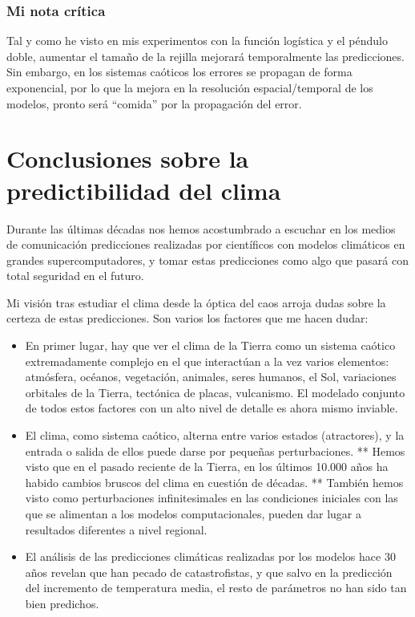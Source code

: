 \documentclass[
  10pt,
  a4paper,
  DIV=11,
  numbers=noendperiod,
  open=any]{scrreprt}
\providecommand{\tightlist}{%
  \setlength{\itemsep}{0pt}\setlength{\parskip}{0pt}}
\numberwithin{equation}{chapter}
\numberwithin{equation}{section}
\renewcommand{\[}{\begin{equation}}
\renewcommand{\]}{\end{equation}}
\begin{document}
\subsection{Mi nota crítica}\label{mi-nota-cruxedtica}

Tal y como he visto en mis experimentos con la función logística y el
péndulo doble, aumentar el tamaño de la rejilla mejorará temporalmente
las predicciones. Sin embargo, en los sistemas caóticos los errores se
propagan de forma exponencial, por lo que la mejora en la resolución
espacial/temporal de los modelos, pronto será ``comida'' por la
propagación del error.

\chapter{Conclusiones sobre la predictibilidad del
clima}\label{conclusiones-sobre-la-predictibilidad-del-clima}

Durante las últimas décadas nos hemos acostumbrado a escuchar en los
medios de comunicación predicciones realizadas por científicos con
modelos climáticos en grandes supercomputadores, y tomar estas
predicciones como algo que pasará con total seguridad en el futuro.

Mi visión tras estudiar el clima desde la óptica del caos arroja dudas
sobre la certeza de estas predicciones. Son varios los factores que me
hacen dudar:

\begin{itemize}
\tightlist
\item
  En primer lugar, hay que ver el clima de la Tierra como un sistema
  caótico extremadamente complejo en el que interactúan a la vez varios
  elementos: atmósfera, océanos, vegetación, animales, seres humanos, el
  Sol, variaciones orbitales de la Tierra, tectónica de placas,
  vulcanismo. El modelado conjunto de todos estos factores con un alto
  nivel de detalle es ahora mismo inviable.
\item
  El clima, como sistema caótico, alterna entre varios estados
  (atractores), y la entrada o salida de ellos puede darse por pequeñas
  perturbaciones. ** Hemos visto que en el pasado reciente de la Tierra,
  en los últimos 10.000 años ha habido cambios bruscos del clima en
  cuestión de décadas. ** También hemos visto como perturbaciones
  infinitesimales en las condiciones iniciales con las que se alimentan
  a los modelos computacionales, pueden dar lugar a resultados
  diferentes a nivel regional.
\item
  El análisis de las predicciones climáticas realizadas por los modelos
  hace 30 años revelan que han pecado de catastrofistas, y que salvo en
  la predicción del incremento de temperatura media, el resto de
  parámetros no han sido tan bien predichos.
\end{itemize}
\end{document}
